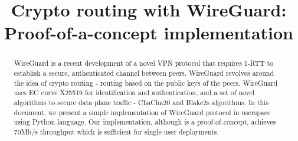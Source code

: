 \documentclass[11pt,twoside,a4paper]{article}
\begin{document}
\sloppy
\title{Crypto routing with WireGuard: Proof-of-a-concept implementation}
\maketitle
\begin{abstract}
    WireGuard is a recent development of a novel VPN protocol that requires
    1-RTT to establish a secure, authenticated channel between peers. 
    WireGuard revolves around the idea of crypto routing - routing based on 
    the public keys of the peers. WireGuard uses EC curve X25519 for 
    identification and authentication, and a set of novel algorithms to secure 
    data plane traffic - ChaCha20 and Blake2s algorithms. In this document, we 
    present a simple implementation of WireGuard protocol in userspace using 
    Python language. Our implementation, although is a proof-of-concept, 
    achieves 70Mb/s throughput which is sufficient for single-user deployments.
\end{abstract}

 



\balance


\end{document}

